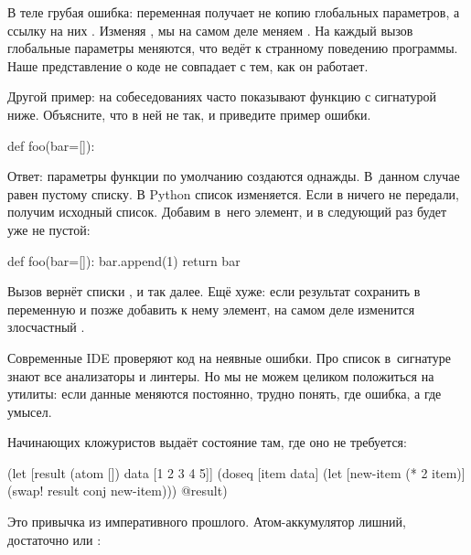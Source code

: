 \fi


В теле  грубая ошибка: переменная  получает
не копию глобальных параметров, а ссылку на них \ifnarrow{}\else{}\fi.
Изменяя , мы на самом деле меняем 
\ifnarrow{}\else{}\fi. На каждый вызов
глобальные параметры меняются, что ведёт к странному поведению программы.
Наше представление о коде не совпадает с тем, как он работает.

Другой пример: на собеседованиях часто показывают функцию с сигнатурой
ниже. Объясните, что в ней не так, и приведите пример ошибки.

\begin{python}
def foo(bar=[]):
\end{python}

Ответ: параметры функции по умолчанию создаются однажды. В~данном случае
 равен пустому списку. В Python список изменяется. Если в
 ничего не передали, получим исходный список. Добавим в~него
элемент, и в следующий раз  будет уже не пустой:

\begin{python}
def foo(bar=[]):
    bar.append(1)
    return bar
\end{python}

Вызов  вернёт списки \code{[1]}, \code{[1, 1]} и так
далее. Ещё хуже: если результат  сохранить в переменную и позже
добавить к нему элемент, на самом деле изменится злосчастный .

Современные IDE проверяют код на неявные ошибки. Про список в~сигнатуре знают
все анализаторы и линтеры. Но мы не можем целиком положиться на утилиты: если
данные меняются постоянно, трудно понять, где ошибка, а где умысел.

Начинающих кложуристов выдаёт состояние там, где оно не требуется:

\begin{clojure}
(let [result (atom [])
      data [1 2 3 4 5]]
  (doseq [item data]
    (let [new-item (* 2 item)]
      (swap! result conj new-item)))
  @result)
\end{clojure}


Это привычка из императивного прошлого. Атом-аккумулятор лишний, достаточно
 или :

\ifnarrow

